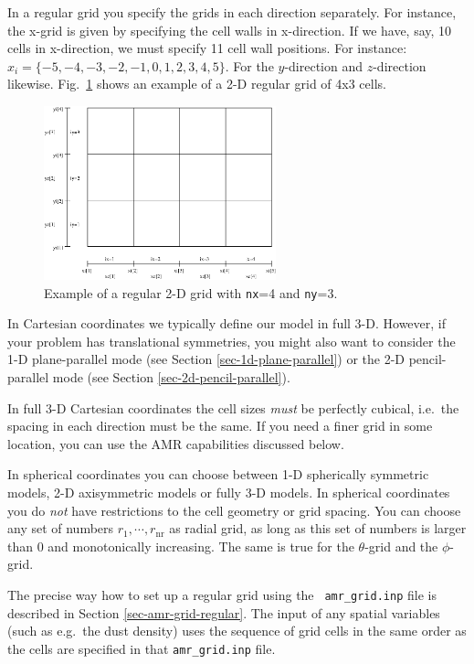 \documentclass{report}
\begin{document}
In a regular grid you specify the grids in each direction separately.  For
instance, the x-grid is given by specifying the cell walls in
x-direction. If we have, say, 10 cells in x-direction, we must specify 11
cell wall positions. For instance: $x_i=\{-5,-4,-3,-2,-1,0,1,2,3,4,5\}$.
For the $y$-direction and $z$-direction likewise. Fig.~\ref{fig-regular-grid}
shows an example of a 2-D regular grid of 4x3 cells.
%
\begin{figure}
\centerline{\includegraphics[width=0.6\textwidth]{base_amr_bare.eps}}
\caption{\label{fig-regular-grid}
Example of a regular 2-D grid with {\small\tt nx}=4 and {\small\tt ny}=3.
}
\end{figure}
%
In Cartesian coordinates we typically define our model in full 3-D.
However, if your problem has translational symmetries, you might also want
to consider the 1-D plane-parallel mode (see Section
\ref{sec-1d-plane-parallel}) or the 2-D pencil-parallel mode 
(see Section \ref{sec-2d-pencil-parallel}). 

In full 3-D Cartesian coordinates the cell sizes {\em must} be perfectly
cubical, i.e.\ the spacing in each direction must be the same. If you need a
finer grid in some location, you can use the AMR capabilities discussed
below.

In spherical coordinates you can choose between 1-D spherically symmetric
models, 2-D axisymmetric models or fully 3-D models. In spherical coordinates
you do {\em not} have restrictions to the cell geometry or grid spacing. 
You can choose any set of numbers $r_1,\cdots,r_{\mathrm{nr}}$ as radial
grid, as long as this set of numbers is larger than 0 and monotonically
increasing. The same is true for the $\theta$-grid and the $\phi$-grid.

The precise way how to set up a regular grid using the {\small\tt
  amr\_grid.inp} file is described in Section \ref{sec-amr-grid-regular}.
The input of any spatial variables (such as e.g.\ the dust density) uses the
sequence of grid cells in the same order as the cells are specified in that
{\small\tt amr\_grid.inp} file. 
\end{document}
